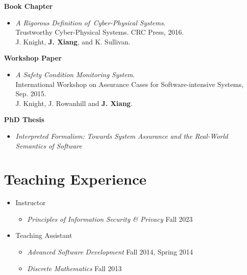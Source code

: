 \documentclass[11pt]{article}
\begin{document}
    
\textbf{Book Chapter}

\begin{itemize}
\item \textit{A Rigorous Definition of Cyber-Physical Systems}. \\
  Trustworthy Cyber-Physical Systems. CRC Press, 2016.\\
  J. Knight, \textbf{J. Xiang}, and K. Sullivan. 
\end{itemize}



\textbf{Workshop Paper}
\begin{itemize}
\item
  \textit{A Safety Condition Monitoring System}. \\
  International Workshop on Assurance Cases for Software-intensive Systems, Sep. 2015. \\
  J. Knight, J. Rowanhill and \textbf{J. Xiang}.
\end{itemize}  


\textbf{PhD Thesis}
\begin{itemize}
\item \textit{Interpreted Formalism: Towards System Assurance and the Real-World Semantics of Software}
\end{itemize}


\section{Teaching Experience}
\begin{itemize}
\item Instructor
\begin{itemize}
  \item \emph{Principles of Information Security \& Privacy} \hfill Fall 2023
\end{itemize}
\item Teaching Assistant
\begin{itemize}
  \item \emph{Advanced Software Development} \hfill Fall 2014, Spring 2014
\item \emph{Discrete Mathematics} \hfill Fall 2013
\end{itemize}
\end{itemize}
\end{document}
